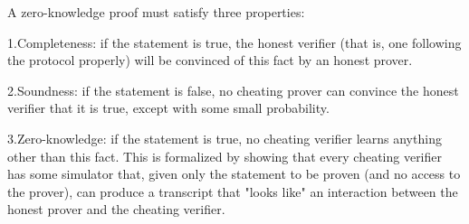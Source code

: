A zero-knowledge proof must satisfy three properties:

1.Completeness: if the statement is true, the honest verifier (that is, one following the protocol properly) will be convinced of this fact by an honest prover.

2.Soundness: if the statement is false, no cheating prover can convince the honest verifier that it is true, except with some small probability.

3.Zero-knowledge: if the statement is true, no cheating verifier learns anything other than this fact. This is formalized by showing that every cheating verifier has some simulator that, given only the statement to be proven (and no access to the prover), can produce a transcript that "looks like" an interaction between the honest prover and the cheating verifier.




